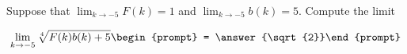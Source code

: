 \documentclass{ximera}
\author{Matthew Carr}
\begin{document}
\begin{exercise}
Suppose that $\lim_{k\to-5}F(k)=1$ and $\lim_{k\to-5}b(k)=5$. Compute the limit

\[
\lim_{k\to -5 } \sqrt[4]{F(k)b(k)+5}\begin{prompt} = \answer{\sqrt{2}}\end{prompt}
\]
\end{exercise}
\end{document}

